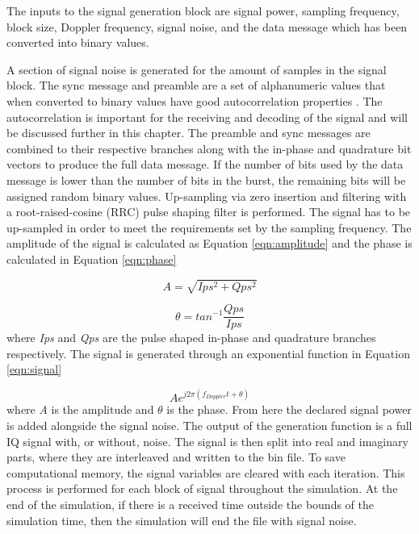 \documentclass[12pt]{report}
\begin{document}
The inputs to the signal generation block are signal power, sampling frequency, block size, Doppler frequency, signal noise, and the data message which has been converted into binary values.

A section of signal noise is generated for the amount of samples in the signal block. The sync message and preamble are a set of alphanumeric values that when converted to binary values have good autocorrelation properties \cite{dinanSpreadingCodesDirect1998}. The autocorrelation is important for the receiving and decoding of the signal and will be discussed further in this chapter. The preamble and sync messages are combined to their respective branches along with the in-phase and quadrature bit vectors to produce the full data message. If the number of bits used by the data message is lower than the number of bits in the burst, the remaining bits will be assigned random binary values. Up-sampling via zero insertion and filtering with a root-raised-cosine (RRC) pulse shaping filter is performed. The signal has to be up-sampled in order to meet the requirements set by the sampling frequency. The amplitude of the signal is calculated as Equation \ref{eqn:amplitude} and the phase is calculated in Equation \ref{eqn:phase}

\begin{equation}
    A = \sqrt{Ips^2 + Qps^2}
    \label{eqn:amplitude}
\end{equation}

\begin{equation}
    \theta = tan^{-1} \frac{Qps}{Ips}
    \label{eqn:phase}
\end{equation}
where \textit{Ips} and \textit{Qps} are the pulse shaped in-phase and quadrature branches respectively. The signal is generated through an exponential function in Equation \ref{eqn:signal}

\begin{equation}
    A e^{j2\pi (f_{Doppler}t + \theta)}
    \label{eqn:signal}
\end{equation}
where \textit{A} is the amplitude and $\theta$ is the phase. From here the declared signal power is added alongside the signal noise. The output of the generation function is a full IQ signal with, or without, noise. The signal is then split into real and imaginary parts, where they are interleaved and written to the bin file. To save computational memory, the signal variables are cleared with each iteration. This process is performed for each block of signal throughout the simulation. At the end of the simulation, if there is a received time outside the bounds of the simulation time, then the simulation will end the file with signal noise.
\end{document}
